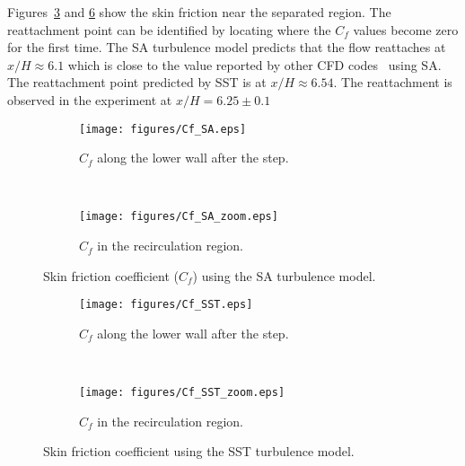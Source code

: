 Figures~\ref{fig:tbfcfsa2} and \ref{fig:tbfsstcf2} show the skin friction near the separated region. The reattachment point can be identified by locating where the $C_f$ values become zero for the first time. The SA turbulence model predicts that the flow reattaches at $x/H\approx6.1$ which is close to the value reported by other CFD codes~\cite{NASATMR} using SA. The reattachment point predicted by SST is at $x/H\approx6.54$. The reattachment is observed in the experiment at $x/H=6.25 \pm 0.1$
\begin{figure}[h!]
    \centering
    \captionsetup{justification=centering}
    \begin{subfigure}[b]{0.48\textwidth}
    \captionsetup{justification=centering}
        \texttt{[image: figures/Cf\_SA.eps]}
        \caption{$C_f$ along the lower wall after the step.}
        \label{fig:tbfcfsa}
    \end{subfigure}
    ~ %
    \begin{subfigure}[b]{0.48\textwidth}
    \centering
    \captionsetup{justification=centering}
        \texttt{[image: figures/Cf\_SA\_zoom.eps]}
        \caption{$C_f$ in the recirculation region.}
        \label{fig:tbfcfsa2}
    \end{subfigure}
    \caption{Skin friction coefficient ($C_f$) using the SA turbulence model.}
\end{figure}
\begin{figure}[h!]
    \centering
    \captionsetup{justification=centering}
    \begin{subfigure}[b]{0.48\textwidth}
    \captionsetup{justification=centering}
        \texttt{[image: figures/Cf\_SST.eps]}
        \caption{$C_f$ along the lower wall after the step.}
        \label{fig:tbfsstcf}
    \end{subfigure}
    ~ %
    \begin{subfigure}[b]{0.48\textwidth}
    \centering
    \captionsetup{justification=centering}
        \texttt{[image: figures/Cf\_SST\_zoom.eps]}
        \caption{$C_f$ in the recirculation region.}
        \label{fig:tbfsstcf2}
    \end{subfigure}
    \caption{Skin friction coefficient using the SST turbulence model.}
\end{figure}

